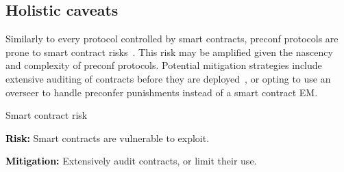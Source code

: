 \documentclass[a4paper]{article}
\theoremstyle{boldstyle}
\newlength{\entrysep}
\newcommand{\risk}[1]{\par\noindent\textbf{\textcolor{black}{Risk:}} #1\par\vspace{\entrysep}}
\newcommand{\mitigation}[1]{\par\noindent\textbf{\textcolor{black}{Mitigation:}} #1}
\begin{document}

    \subsection{Holistic caveats}
    
         Similarly to every protocol controlled by smart contracts, preconf protocols are prone to smart contract risks~\cite{W:SmartContractVulnerabilitiesandMitigationStrategies}. This risk may be amplified given the nascency and complexity of preconf protocols. Potential mitigation strategies include extensive auditing of contracts before they are deployed~\cite{W:CrediblyNeutralPreconfirmationCollateral:ThePreconfirmationRegistry}, or opting to use an overseer to handle preconfer punishments instead of a smart contract EM.
         \begin{riskbox}{Smart contract risk}
            \risk{Smart contracts are vulnerable to exploit.}
            \mitigation{Extensively audit contracts, or limit their use.}
         \end{riskbox}
\end{document}
